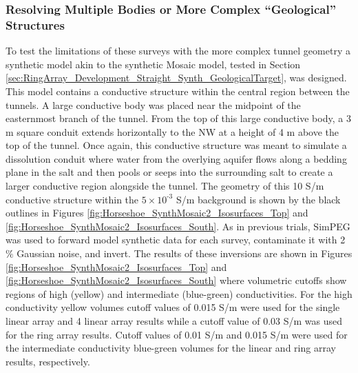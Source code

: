 \documentclass[preprint,authoryear,12pt]{elsarticle}
\begin{document}
\subsubsection{Resolving Multiple Bodies or More Complex ``Geological'' Structures}
\label{sec:RingArray_Development_Horseshoe_Synth_GeologicalTarget}

To test the limitations of these surveys with the more complex tunnel geometry a synthetic model akin to the synthetic Mosaic model, tested in Section \ref{sec:RingArray_Development_Straight_Synth_GeologicalTarget}, was designed. This model contains a conductive structure within the central region between the tunnels. A large conductive body was placed near the midpoint of the easternmost branch of the tunnel. From the top of this large conductive body, a 3 m square conduit extends horizontally to the NW at a height of 4 m above the top of the tunnel. Once again, this conductive structure was meant to simulate a dissolution conduit where water from the overlying aquifer flows along a bedding plane in the salt and then pools or seeps into the surrounding salt to create a larger conductive region alongside the tunnel. The geometry of this 10 S/m conductive structure within the $5 \times 10^{\text{-3}}$ S/m background is shown by the black outlines in Figures \ref{fig:Horseshoe_SynthMosaic2_Isosurfaces_Top} and \ref{fig:Horseshoe_SynthMosaic2_Isosurfaces_South}. As in previous trials, SimPEG was used to forward model synthetic data for each survey, contaminate it with 2$\%$ Gaussian noise, and invert. The results of these inversions are shown in Figures \ref{fig:Horseshoe_SynthMosaic2_Isosurfaces_Top} and \ref{fig:Horseshoe_SynthMosaic2_Isosurfaces_South} where volumetric cutoffs show regions of high (yellow) and intermediate (blue-green) conductivities. For the high conductivity yellow volumes cutoff values of 0.015 S/m were used for the single linear array and 4 linear array results while a cutoff value of 0.03 S/m was used for the ring array results. Cutoff values of 0.01 S/m and 0.015 S/m were used for the intermediate conductivity blue-green volumes for the linear and ring array results, respectively.
\end{document}

